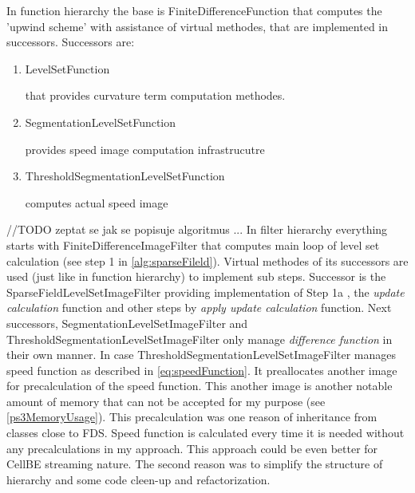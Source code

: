 In function hierarchy the base is FiniteDifferenceFunction that computes the 'upwind scheme' with assistance of virtual methodes, that are implemented in successors.
Successors are:
\begin{enumerate}
  \item{LevelSetFunction}
  \par
  that provides curvature term computation methodes.

\item{SegmentationLevelSetFunction}
\par
provides speed image computation infrastrucutre
\item{ThresholdSegmentationLevelSetFunction}
\par
computes actual speed image
\end{enumerate}

//TODO zeptat se jak se popisuje algoritmus ...
In filter hierarchy everything starts with FiniteDifferenceImageFilter that computes main loop of level set calculation (see step 1 in \ref{alg:sparseFileld}).
Virtual methodes of its successors are used (just like in function hierarchy) to implement sub steps.
Successor is the SparseFieldLevelSetImageFilter providing implementation of Step 1a , the \emph{update calculation} function and other steps by \emph{apply update calculation} function.
Next successors, SegmentationLevelSetImageFilter and ThresholdSegmentationLevelSetImageFilter only manage \emph{difference function} in their own manner.
In case ThresholdSegmentationLevelSetImageFilter manages speed function as described in \ref{eq:speedFunction}.
It preallocates another image for precalculation of the speed function.
This another image is another notable amount of memory that can not be accepted for my purpose (see \ref{ps3MemoryUsage}).
This precalculation was one reason of inheritance from classes close to FDS.
Speed function is calculated every time it is needed without any precalculations in my approach.
This approach could be even better for CellBE streaming nature.
The second reason was to simplify the structure of hierarchy and some code cleen-up and refactorization.

